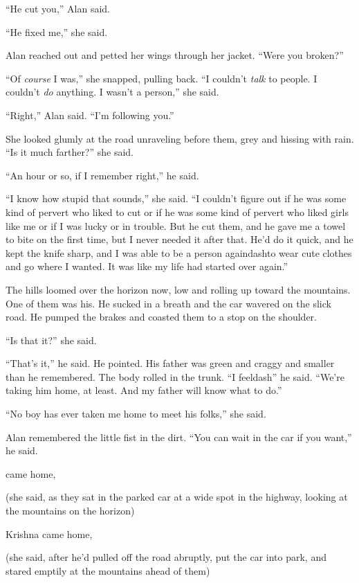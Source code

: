 ``He cut you,'' Alan said.

``He fixed me,'' she said.

Alan reached out and petted her wings through her jacket.  ``Were you
broken?''

``Of \textit{course} I was,'' she snapped, pulling back.  ``I couldn't
\textit{talk} to people.  I couldn't \textit{do} anything.  I wasn't a
person,'' she said.

``Right,'' Alan said.  ``I'm following you.''

She looked glumly at the road unraveling before them, grey and hissing
with rain.  ``Is it much farther?'' she said.

``An hour or so, if I remember right,'' he said.

``I know how stupid that sounds,'' she said.  ``I couldn't figure out
if he was some kind of pervert who liked to cut or if he was some kind
of pervert who liked girls like me or if I was lucky or in trouble. 
But he cut them, and he gave me a towel to bite on the first time, but
I never needed it after that.  He'd do it quick, and he kept the knife
sharp, and I was able to be a person againdash{}to wear cute clothes and
go where I wanted.  It was like my life had started over again.''

The hills loomed over the horizon now, low and rolling up toward the
mountains.  One of them was his.  He sucked in a breath and the car
wavered on the slick road.  He pumped the brakes and coasted them to a
stop on the shoulder.

``Is that it?'' she said.

``That's it,'' he said.  He pointed.  His father was green and craggy
and smaller than he remembered.  The body rolled in the trunk.  ``I
feeldash{}'' he said.  ``We're taking him home, at least.  And my father
will know what to do.''

``No boy has ever taken me home to meet his folks,'' she said.

Alan remembered the little fist in the dirt.  ``You can wait in the
car if you want,'' he said.

 came home,

(she said, as they sat in the parked car at a wide spot in the
highway, looking at the mountains on the horizon)

Krishna came home,

(she said, after he'd pulled off the road abruptly, put the car into
park, and stared emptily at the mountains ahead of them)


